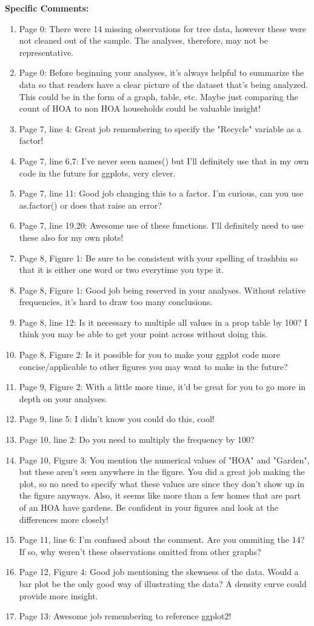 \documentclass{article}
\begin{document}
\textbf{Specific Comments:} 
\begin{enumerate}
  \item Page 0: There were 14 missing observations for tree data, however these were not cleaned out of the sample. The analyses, therefore, may not be representative.
  \item Page 0: Before beginning your analyses, it's always helpful to summarize the data so that readers have a clear picture of the dataset that's being analyzed. This could be in the form of a graph, table, etc. Maybe just comparing the count of HOA to non HOA households could be valuable insight!
  \item Page 7, line 4: Great job remembering to specify the "Recycle" variable as a factor!
  \item Page 7, line 6,7: I've never seen names() but I'll definitely use that in my own code in the future for ggplots, very clever.
  \item Page 7, line 11: Good job changing this to a factor. I'm curious, can you use as.factor() or does that raise an error?
  \item Page 7, line 19,20: Awesome use of these functions. I'll definitely need to use these also for my own plots!
  \item Page 8, Figure 1: Be sure to be consistent with your spelling of trashbin so that it is either one word or two everytime you type it.
  \item Page 8, Figure 1: Good job being reserved in your analyses. Without relative frequencies, it's hard to draw too many conclusions.
  \item Page 8, line 12: Is it necessary to multiple all values in a prop table by 100? I think you may be able to get your point across without doing this.
  \item Page 8, Figure 2: Is it possible for you to make your ggplot code more concise/applicable to other figures you may want to make in the future?  
  \item Page 9, Figure 2: With a little more time, it'd be great for you to go more in depth on your analyses. 
  \item Page 9, line 5: I didn't know you could do this, cool!
  \item Page 10, line 2: Do you need to multiply the frequency by 100?
  \item Page 10, Figure 3: You mention the numerical values of "HOA" and "Garden", but these aren't seen anywhere in the figure. You did a great job making the plot, so no need to specify what these values are since they don't show up in the figure anyways. Also, it seems like more than a few homes that are part of an HOA have gardens. Be confident in your figures and look at the differences more closely!
  \item Page 11, line 6: I'm confused about the comment. Are you ommiting the 14? If so, why weren't these observations omitted from other graphs?
  \item Page 12, Figure 4: Good job mentioning the skewness of the data. Would a bar plot be the only good way of illustrating the data? A density curve could provide more insight. 
  \item Page 13: Awesome job remembering to reference ggplot2!
\end{enumerate}
\end{document}
